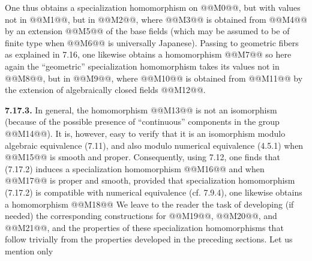 One thus obtains a specialization homomorphism on @@M0@@, but with values not in @@M1@@, but in @@M2@@, where @@M3@@ is obtained from @@M4@@ by an extension @@M5@@ of the base fields (which may be assumed to be of finite type when @@M6@@ is universally Japanese). Passing to geometric fibers as explained in 7.16, one likewise obtains a homomorphism
@@M7@@
so here again the ``geometric'' specialization homomorphism takes its values not in @@M8@@, but in @@M9@@, where @@M10@@ is obtained from @@M11@@ by the extension of algebraically closed fields @@M12@@.

\textbf{7.17.3.} In general, the homomorphism @@M13@@ is not an isomorphism (because of the possible presence of ``continuous'' components in the group @@M14@@). It is, however, easy to verify that it is an isomorphism modulo algebraic equivalence (7.11), and also modulo numerical equivalence (4.5.1) when @@M15@@ is smooth and proper. Consequently, using 7.12, one finds that (7.17.2) induces a specialization homomorphism
@@M16@@
and when @@M17@@ is proper and smooth, provided that specialization homomorphism (7.17.2) is compatible with numerical equivalence (cf. 7.9.4), one likewise obtains a homomorphism
@@M18@@
We leave to the reader the task of developing (if needed) the corresponding constructions for @@M19@@, @@M20@@, and @@M21@@, and the properties of these specialization homomorphisms that follow trivially from the properties developed in the preceding sections. Let us mention only
